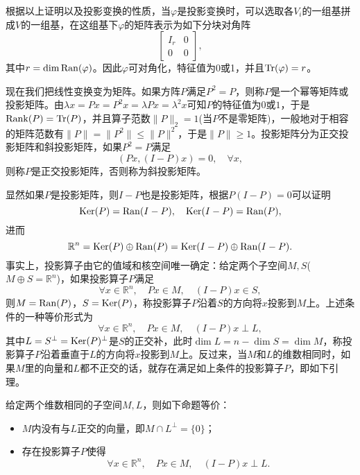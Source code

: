 \documentclass[a4paper,10pt]{ctexart}
\begin{document}
根据以上证明以及投影变换的性质，当$ \varphi $是投影变换时，可以选取各$ V_i $的一组基拼成$ V $的一组基，在这组基下$ \varphi $的矩阵表示为如下分块对角阵
\[
    \begin{bmatrix} 
        I_r & 0 \\
        0 & 0 
    \end{bmatrix} ,
\]
其中$ r = \dim {\rm Ran}(\varphi) $。因此$ \varphi $可对角化，特征值为0或1，并且$ {\rm Tr }(\varphi) = r $。

现在我们把线性变换变为矩阵。如果方阵$ P $满足$ P^2 = P $，则称$ P $是一个幂等矩阵或投影矩阵。由$ \lambda x =Px = P^2 x=\lambda Px = \lambda^2 x $可知$ P $的特征值为$ 0 $或$ 1 $，于是$ {\rm Rank}(P) = {\rm Tr}(P) $，并且算子范数$ \| P \|_2 = 1 $(当$ P $不是零矩阵)，一般地对于相容的矩阵范数有$ \| P \| =\| P^2 \| \leqslant \| P \|^2 $，于是$ \| P \|\geqslant 1 $。投影矩阵分为正交投影矩阵和斜投影矩阵，如果$ P^2=P $满足
\[
    (Px,(I-P)x) = 0, \quad \forall x,
\]
则称$ P $是正交投影矩阵，否则称为斜投影矩阵。

显然如果$ P $是投影矩阵，则$ I-P $也是投影矩阵，根据$ P(I-P)=0 $可以证明
\[
    {\rm Ker} (P) = {\rm Ran}(I-P),\quad {\rm Ker} (I-P) = {\rm Ran}(P),
\]
进而
\[
    \mathbb{R}^n = {\rm Ker}(P) \oplus {\rm Ran}(P) = {\rm Ker}(I-P) \oplus {\rm Ran}(I-P).
\]
事实上，投影算子由它的值域和核空间唯一确定：给定两个子空间$ M,S $($ M\oplus S = \mathbb{R}^n $)，如果投影算子$ P $满足
\[
    \forall x\in \mathbb{R}^n,\quad  Px \in M,\quad (I-P)x\in S,
\]
则$ M = {\rm Ran}(P) $，$ S = {\rm Ker}(P) $，称投影算子$ P $沿着$ S $的方向将$ x $投影到$ M $上。上述条件的一种等价形式为
\[
    \forall x\in \mathbb{R}^n,\quad  Px \in M,\quad (I-P)x \perp L,
\]
其中$ L = S^\perp = {\rm Ker}(P)^\perp $是$ S $的正交补，此时$ \dim L = n - \dim S = \dim M $，称投影算子$ P $沿着垂直于$ L $的方向将$ x $投影到$ M $上。反过来，当$ M $和$ L $的维数相同时，如果$ M $里的向量和$ L $都不正交的话，就存在满足如上条件的投影算子$ P $，即如下引理。

\begin{lemma}
    给定两个维数相同的子空间$ M,L $，则如下命题等价：
    \begin{itemize}
        \item $ M $内没有与$ L $正交的向量，即$ M\cap L^\perp=\{0\} $；
        \item 存在投影算子$ P $使得
        \[
            \forall x\in \mathbb{R}^n,\quad  Px \in M,\quad (I-P)x \perp L.
        \]
    \end{itemize}
\end{lemma}
\end{document}
